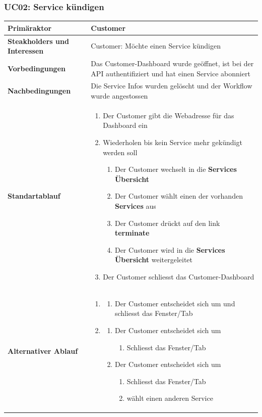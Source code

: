 \documentclass[11pt]{scrartcl}
\begin{document}
\subsubsection{UC02: Service kündigen}
\begin{longtabu} to \textwidth {X[1,l] X[2,l]}
	\bfseries Primäraktor & Customer  \\\hline 
	\bfseries Steakholders und Interessen & Customer: Möchte einen Service kündigen  \\\hline 
	\bfseries Vorbedingungen & Das Customer-Dashboard wurde geöffnet, ist bei der API authentifiziert und 
	hat einen Service abonniert  \\\hline 
	\bfseries Nachbedingungen & Die Service Infos wurden gelöscht und der Workflow wurde angestossen   \\\hline 
	\bfseries Standartablauf & 
		\begin{enumerate}
			\item Der Customer gibt die Webadresse für das Dashboard ein
			\item Wiederholen bis kein Service mehr gekündigt werden soll
			\begin{enumerate}
			    \item Der Customer wechselt in die \textbf{Services Übersicht}
			    \item Der Customer wählt einen der vorhanden \textbf{Services} aus
			    \item Der Customer drückt auf den link \textbf{terminate}
			    \item Der Customer wird in die \textbf{Services Übersicht} weitergeleitet
			\end{enumerate}
		\item Der Customer schliesst das Customer-Dashboard
		\end{enumerate}
      \\\hline
      	\bfseries Alternativer Ablauf & 
		\begin{enumerate}
		  
		\item
		  \begin{enumerate}
		    \item Der Customer entscheidet sich um und schliesst das 
		    Fenster/Tab
		  \end{enumerate}
		  \item 
                 \begin{enumerate}
		    \item Der Customer entscheidet sich um
		    \begin{enumerate}
		      \item Schliesst das Fenster/Tab
		    \end{enumerate}
		    \item  Der Customer entscheidet sich um
		     \begin{enumerate}
		      \item Schliesst das Fenster/Tab
		      \item wählt einen anderen Service
		    \end{enumerate}
		    

\end{enumerate}
\end{enumerate}
\end{longtabu}
\end{document}
